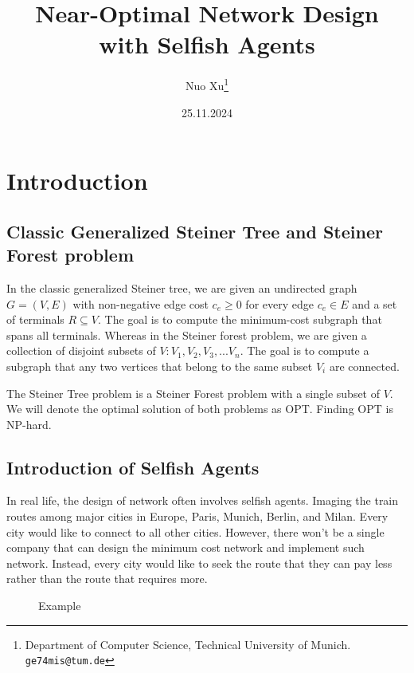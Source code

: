 \documentclass[11pt,psfig,times]{article}
\begin{document}
\title{Near-Optimal Network Design with Selfish Agents}
\author{Nuo Xu\thanks {Department of Computer Science, Technical University of Munich. {\tt ge74mis@tum.de}}}
\date{25.11.2024}
\maketitle

\section{Introduction}

\subsection{Classic Generalized Steiner Tree and Steiner Forest problem}
In the classic generalized Steiner tree, we are given an undirected graph \(G = (V,E)\) with non-negative edge cost \(c_e \geq 0\) for every edge $c_e \in E$ and a set of terminals $R \subseteq V $. The goal is to compute the minimum-cost subgraph that spans all terminals. Whereas in the Steiner forest problem, we are given a collection of disjoint subsets of \(V: V_1,V_2,V_3,...V_n\). The goal is to compute a subgraph that any two vertices that belong to the same subset \(V_i\) are connected. 

The Steiner Tree problem is a Steiner Forest problem with a single subset of \(V\). We will denote the optimal solution of both problems as OPT. Finding OPT is NP-hard. 

\subsection{Introduction of Selfish Agents}
In real life, the design of network often involves selfish agents. Imaging the train routes among major cities in Europe, Paris, Munich, Berlin, and Milan. Every city would like to connect to all other cities. However, there won't be a single company that can design the minimum cost network and implement such network. Instead, every city would like to seek the route that they can pay less rather than the route that requires more. 
\begin{figure}[H]
	\begin{center}
	\end{center}
	\caption{Example}
\end{figure}
\end{document}
